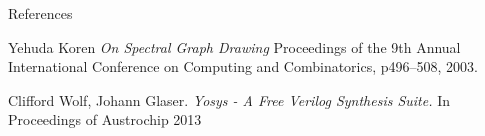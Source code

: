 \documentclass[serif, 12pt]{beamer}
\begin{document}
\begin{frame}{References}

\begin{thebibliography}{9}

Yehuda Koren
\textsl{On Spectral Graph Drawing}
Proceedings of the 9th Annual International Conference on Computing and 
Combinatorics, p496--508, 2003.

Clifford Wolf, Johann Glaser.
\textsl{Yosys - A Free Verilog Synthesis Suite.}
In Proceedings of Austrochip 2013

\end{thebibliography}

\end{frame}
\end{document}
